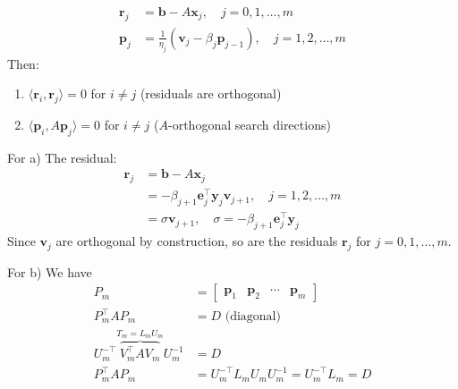 \begin{proposition}{}{}
    \begin{align*}
        \mathbf{r}_j & = \mathbf{b} - A \mathbf{x}_j, \quad j = 0, 1, \dots, m                                \\
        \mathbf{p}_j & = \frac{1}{\eta_j} (\mathbf{v}_j - \beta_j \mathbf{p}_{j-1}), \quad j = 1, 2, \dots, m
    \end{align*}
    Then:
    \begin{enumerate}[label=(\alph*)]
        \item $\langle \mathbf{r}_i, \mathbf{r}_j \rangle = 0$ for $i \neq j$ (residuals are orthogonal)
        \item $\langle \mathbf{p}_i, A \mathbf{p}_j \rangle = 0$ for $i \neq j$ ($A$-orthogonal search directions)
    \end{enumerate}
\end{proposition}

For a) The residual:
\begin{align*}
    \mathbf{r}_j & = \mathbf{b} - A \mathbf{x}_j                                                            \\
                 & = -\beta_{j+1} \mathbf{e}_j^\top \mathbf{y}_j \mathbf{v}_{j+1}, \quad j = 1, 2, \dots, m \\
                 & = \sigma \mathbf{v}_{j+1}, \quad \sigma = -\beta_{j+1} \mathbf{e}_j^\top \mathbf{y}_j
\end{align*}
Since $\mathbf{v}_j$ are orthogonal by construction, so are the residuals $\mathbf{r}_j$ for $j = 0, 1, \dots, m$.

For b) We have
\begin{align*}
    P_m                                                          & = \begin{bmatrix}
                                                                         \mathbf{p}_1 & \mathbf{p}_2 & \cdots & \mathbf{p}_m
                                                                     \end{bmatrix} \\
    P_m^\top A P_m                                               & = D \text{ (diagonal) }                               \\
    U_m^{-\top}\overbrace{V_m^\top A V_m}^{T_m=L_m U_m} U_m^{-1} & = D                                                   \\
    P_m^\top A P_m                                               & = U_m^{-\top} L_m U_m U_m^{-1} = U_m^{-\top} L_m = D
\end{align*}

